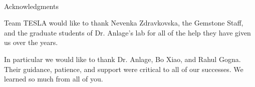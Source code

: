 \renewcommand{\baselinestretch}{2}
\small\normalsize
\hbox{\ }
 
\vspace{-.65in}

\begin{center}
\large{Acknowledgments} 
\end{center} 

\vspace{1ex}

Team TESLA would like to thank Nevenka Zdravkovska, the Gemstone Staff, and the graduate students of Dr. Anlage's lab for all of the help they have given us over the years.

In particular we would like to thank Dr. Anlage, Bo Xiao, and Rahul Gogna. Their guidance, patience, and support were critical to all of our successes. We learned so much from all of you.

